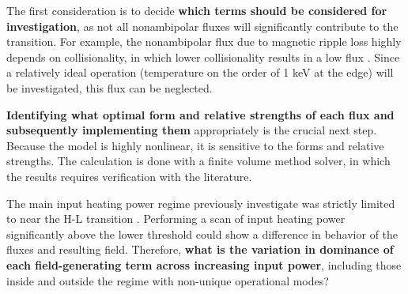 The first consideration is to decide \textbf{which terms should be considered for investigation}, as not all nonambipolar fluxes will significantly contribute to the transition.
For example, the nonambipolar flux due to magnetic ripple loss highly depends on collisionality, in which lower collisionality results in a low flux \cite{stringer_ripple_1972}.
Since a relatively ideal operation (temperature on the order of 1 keV at the edge) will be investigated, this flux can be neglected.

\textbf{Identifying what optimal form and relative strengths of each flux and subsequently implementing them} appropriately is the crucial next step.
Because the model is highly nonlinear, it is sensitive to the forms and relative strengths.
The calculation is done with a finite volume method solver, in which the results requires verification with the literature.

The main input heating power regime previously investigate was strictly limited to near the H-L transition \cite{staps_backstepping_2017}.
Performing a scan of input heating power significantly above the lower threshold could show a difference in behavior of the fluxes and resulting field.
Therefore, \textbf{what is the variation in dominance of each field-generating term across increasing input power}, including those inside and outside the regime with non-unique operational modes?

